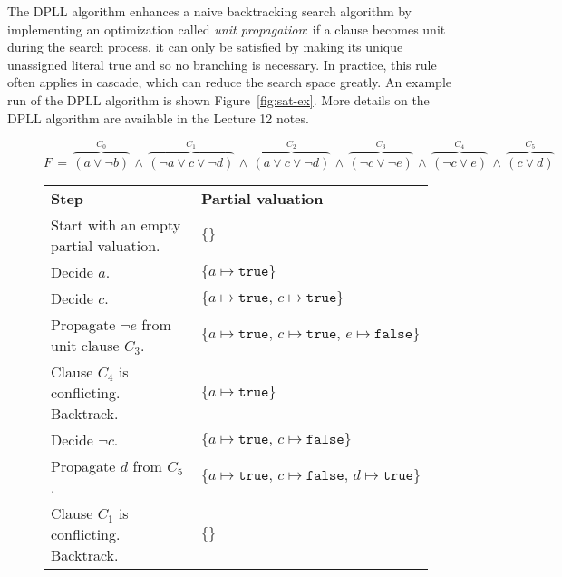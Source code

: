 \documentclass[11pt]{article}
\begin{document}
The {DPLL} algorithm enhances a naive backtracking search algorithm
by implementing an optimization called \emph{unit propagation}: if a clause
becomes unit during the search process, it can only be satisfied by making its unique
unassigned literal true and so no branching is necessary. In practice, this rule
often applies in cascade, which can reduce the search space greatly. An example run
of the {DPLL} algorithm is shown Figure~\ref{fig:sat-ex}.
More details on the DPLL algorithm are available in the Lecture 12 notes.

\bigskip

\newcommand{\true}[0]{\texttt{true}}
\newcommand{\false}[0]{\texttt{false}}


\begin{figure}[h!]
\hrulefill
\small
\[F \,=\, 
  \overbrace{(a \lor \lnot b)}^{C_0} \,\wedge\, 
  \overbrace{(\lnot a \lor c \lor \lnot d)}^{C_1} \,\wedge\, 
    \overbrace{(a \lor c \lor \lnot d)}^{C_2} \,\wedge\,
    \overbrace{(\lnot c \lor \lnot e)}^{C_3}  \,\wedge\,
    \overbrace{(\lnot c \lor e)}^{C_4}  \,\wedge\,
    \overbrace{(c \lor d)}^{C_5}
\]


\begin{center}
\begin{tabular}{ll}

\textbf{Step} & \textbf{Partial valuation} \\


Start with an empty partial valuation. & $\{\}$ \\

Decide $a$. & $\{a \mapsto \true \}$ \\

\quad Decide $c$. & $\{a \mapsto \true,\, c \mapsto \true \}$ \\

\quad \quad Propagate $\lnot e$ from unit clause $C_3$. & 
$\{a \mapsto \true,\, c \mapsto \true,\, e \mapsto \false \}$ \\

\quad \quad Clause $C_4$ is conflicting. Backtrack. & $\{a \mapsto \true \}$ \\

\quad Decide $\lnot c$. & $\{a \mapsto \true,\, c \mapsto \false \}$ \\

\quad \quad Propagate $d$ from $C_5$. & 
$\{a \mapsto \true,\, c \mapsto \false,\, d \mapsto \true \}$ \\

\quad \quad Clause $C_1$ is conflicting. Backtrack. & $\{ \}$ \\


\end{tabular}
\end{center}
\end{figure}
\end{document}
